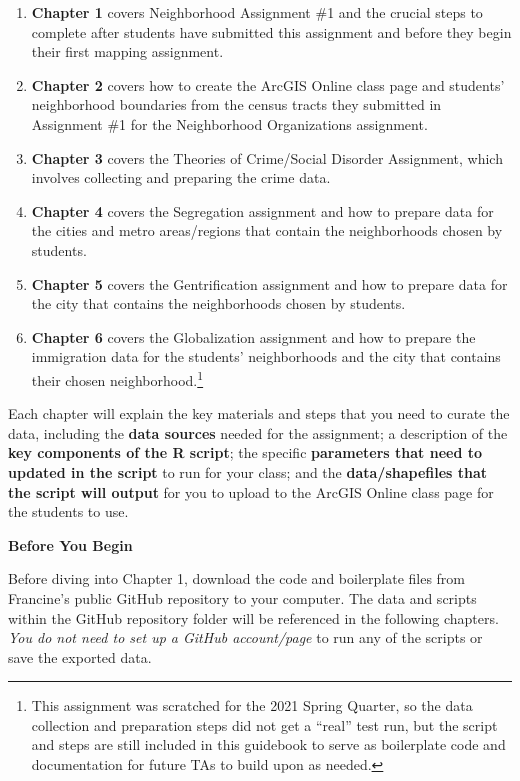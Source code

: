 \documentclass[
]{book}
\providecommand{\tightlist}{%
  \setlength{\itemsep}{0pt}\setlength{\parskip}{0pt}}
\begin{document}
\begin{enumerate}
\def\labelenumi{\arabic{enumi}.}
\tightlist
\item
  \textbf{Chapter 1} covers Neighborhood Assignment \#1 and the crucial steps to complete after students have submitted this assignment and before they begin their first mapping assignment.
\item
  \textbf{Chapter 2} covers how to create the ArcGIS Online class page and students' neighborhood boundaries from the census tracts they submitted in Assignment \#1 for the Neighborhood Organizations assignment.
\item
  \textbf{Chapter 3} covers the Theories of Crime/Social Disorder Assignment, which involves collecting and preparing the crime data.
\item
  \textbf{Chapter 4} covers the Segregation assignment and how to prepare data for the cities and metro areas/regions that contain the neighborhoods chosen by students.
\item
  \textbf{Chapter 5} covers the Gentrification assignment and how to prepare data for the city that contains the neighborhoods chosen by students.
\item
  \textbf{Chapter 6} covers the Globalization assignment and how to prepare the immigration data for the students' neighborhoods and the city that contains their chosen neighborhood.\footnote{This assignment was scratched for the 2021 Spring Quarter, so the data collection and preparation steps did not get a ``real'' test run, but the script and steps are still included in this guidebook to serve as boilerplate code and documentation for future TAs to build upon as needed.}
\end{enumerate}

Each chapter will explain the key materials and steps that you need to curate the data, including the \textbf{data sources} needed for the assignment; a description of the \textbf{key components of the R script}; the specific \textbf{parameters that need to updated in the script} to run for your class; and the \textbf{data/shapefiles that the script will output} for you to upload to the ArcGIS Online class page for the students to use.

\textbf{Before You Begin}

Before diving into Chapter 1, download the code and boilerplate files from Francine's public GitHub repository to your computer. The data and scripts within the GitHub repository folder will be referenced in the following chapters. \emph{You do not need to set up a GitHub account/page} to run any of the scripts or save the exported data.
\end{document}
